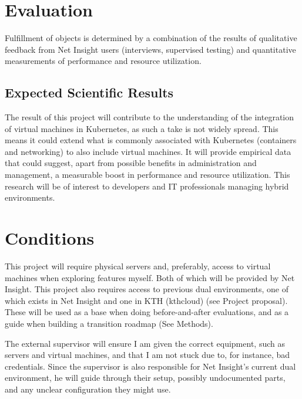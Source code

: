 \documentclass{article}
\begin{document}
\section{Evaluation}
Fulfillment of objects is determined by a combination of the results of qualitative feedback from Net Insight users (interviews, supervised testing) and quantitative measurements of performance and resource utilization. 

\subsection{Expected Scientific Results}
The result of this project will contribute to the understanding of the integration of virtual machines in Kubernetes, as such a take is not widely spread. This means it could extend what is commonly associated with Kubernetes (containers and networking) to also include virtual machines. It will provide empirical data that could suggest, apart from possible benefits in administration and management, a measurable boost in performance and resource utilization. This research will be of interest to developers and IT professionals managing hybrid environments. 


\section{Conditions}
This project will require physical servers and, preferably, access to virtual machines when exploring features myself. Both of which will be provided by Net Insight.
This project also requires access to previous dual environments, one of which exists in Net Insight and one in KTH (kthcloud) (see Project proposal). These will be used as a base when doing before-and-after evaluations, and as a guide when building a transition roadmap (See Methods).

The external supervisor will ensure I am given the correct equipment, such as servers and virtual machines, and that I am not stuck due to, for instance, bad credentials. Since the supervisor is also responsible for Net Insight’s current dual environment, he will guide through their setup, possibly undocumented parts, and any unclear configuration they might use. 


\printbibliography[heading=bibintoc]
\end{document}

